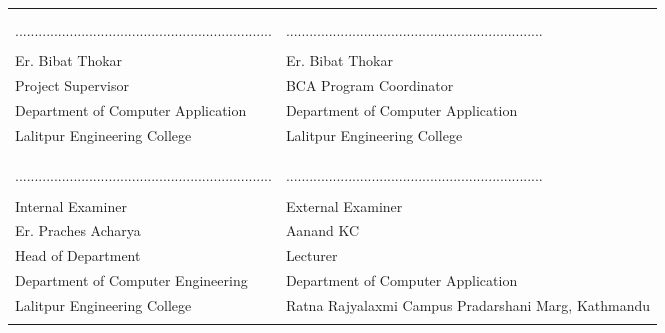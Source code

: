 \begin{center}
    {\fontsize{14pt}{18}\selectfont
    \begin{table}[ht]
        \begin{tabularx}{\textwidth}{|Y|Y|}
        \hline
        &\\
        &\\
        ..................................................................&..................................................................\\
        &\\
        Er. Bibat Thokar & Er. Bibat Thokar \\
        Project Supervisor & BCA Program Coordinator \\
        Department of Computer Application & Department of Computer Application\\
        Lalitpur Engineering College & Lalitpur Engineering College \\
        &\\
        \hline
        &\\
        &\\
        ..................................................................&..................................................................\\
        &\\
        Internal Examiner & External Examiner \\
        Er. Praches Acharya & Aanand KC \\
        Head of Department & Lecturer\\
        Department of Computer Engineering & Department of Computer Application\\
        Lalitpur Engineering College& Ratna Rajyalaxmi Campus Pradarshani Marg, Kathmandu\\
        &\\
        \hline
        \end{tabularx}
        \end{table}
    }
\end{center}